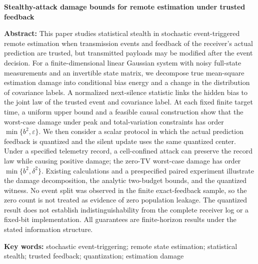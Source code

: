 \bigskip
\begin{center}
{\large\bfseries Stealthy-attack damage bounds for remote estimation under trusted feedback\par}
\end{center}
\noindent\textbf{Abstract:}
This paper studies statistical stealth in stochastic event-triggered remote estimation when transmission events and feedback of the receiver's actual prediction are trusted, but transmitted payloads may be modified after the event decision. For a finite-dimensional linear Gaussian system with noisy full-state measurements and an invertible state matrix, we decompose true mean-square estimation damage into conditional bias energy and a change in the distribution of covariance labels. A normalized next-silence statistic links the hidden bias to the joint law of the trusted event and covariance label. At each fixed finite target time, a uniform upper bound and a feasible causal construction show that the worst-case damage under peak and total-variation constraints has order \(\min\{b^2,\varepsilon\}\). We then consider a scalar protocol in which the actual prediction feedback is quantized and the silent update uses the same quantized center. Under a specified telemetry record, a cell-confined attack can preserve the record law while causing positive damage; the zero-TV worst-case damage has order \(\min\{b^2,\delta^2\}\). Existing calculations and a prespecified paired experiment illustrate the damage decomposition, the analytic two-budget bounds, and the quantized witness. No event split was observed in the finite exact-feedback sample, so the zero count is not treated as evidence of zero population leakage. The quantized result does not establish indistinguishability from the complete receiver log or a fixed-bit implementation. All guarantees are finite-horizon results under the stated information structure.

\smallskip
\noindent\textbf{Key words:} stochastic event-triggering; remote state estimation; statistical stealth; trusted feedback; quantization; estimation damage
